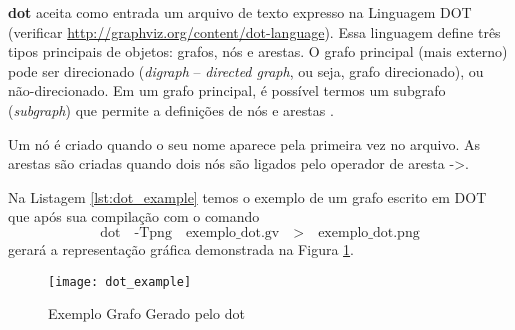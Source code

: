 \textbf{dot} aceita como entrada um arquivo de texto expresso na Linguagem
DOT (verificar \url{http://graphviz.org/content/dot-language}). Essa
linguagem define três tipos principais de objetos: grafos, nós e arestas.
O grafo principal (mais externo) pode ser direcionado (\emph{digraph} {--}
\emph{directed graph}, ou seja, grafo direcionado), ou não-direcionado. Em um
grafo principal, é possível termos um subgrafo (\emph{subgraph}) que permite
a definições de nós e arestas \cite{gansner09}.

Um nó é criado quando o seu nome aparece pela primeira vez no arquivo. As
arestas são criadas quando dois nós são ligados pelo operador de aresta {->}.



Na Listagem \ref{lst:dot_example} temos o exemplo de um grafo escrito em
DOT que após sua compilação com o comando
$$
\text{dot} \quad \text{-Tpng} \quad \text{exemplo\_dot.gv} \quad \text{>}
\quad \text{exemplo\_dot.png}
$$
gerará a representação gráfica demonstrada na Figura \ref{fig:dot_example}.

\begin{figure}[htb]
	\begin{center}
		\texttt{[image: dot\_example]}
	\end{center}
	\caption{Exemplo Grafo Gerado pelo dot}
	\label{fig:dot_example}
\end{figure}

